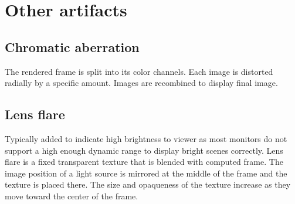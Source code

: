 \chapter{Other artifacts}
\section{Chromatic aberration}
\label{ch:Content2:sec:Section1}
The rendered frame is split into its color channels.
Each image is distorted radially by a specific amount.
Images are recombined to display final image.

\section{Lens flare}
\label{ch:Content2:sec:Section2}
Typically added to indicate high brightness to viewer as most monitors do not support a high enough dynamic range to display bright scenes correctly.
Lens flare is a fixed transparent texture that is blended with computed frame.
The image position of a light source is mirrored at the middle of the frame and the texture is placed there.
The size and opaqueness of the texture increase as they move toward the center of the frame.